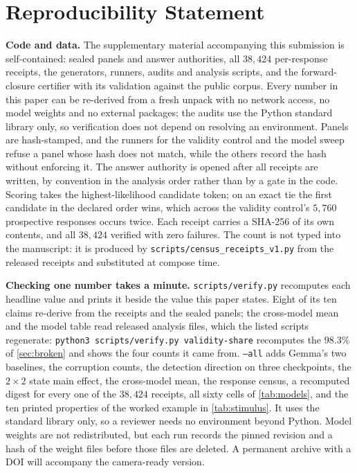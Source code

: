 \documentclass[10pt,twocolumn]{article}
\begin{document}
\section*{Reproducibility Statement}

\textbf{Code and data.} The supplementary material accompanying this submission
is self-contained: sealed panels and answer authorities, all $38{,}424$
per-response receipts, the generators, runners, audits and analysis scripts, and
the forward-closure certifier with its validation against the public corpus.
Every number in this paper can be re-derived from a fresh unpack with no network
access, no model weights and no external packages; the audits use the Python standard
library only, so verification does not depend on resolving an
environment. Panels are hash-stamped, and the runners for the validity control and the model sweep refuse a panel
whose hash does not match, while the others record the hash without enforcing it.
The answer authority is opened after all receipts are written, by convention in
the analysis order rather than by a gate in the code. Scoring takes the
highest-likelihood candidate token; on an exact tie the first candidate in the
declared order wins, which across the validity control's $5{,}760$ prospective responses
occurs twice. Each receipt carries a SHA-256 of its own contents,
and all $38{,}424$ verified with zero failures. The count is not typed into the manuscript: it is
produced by \texttt{scripts/census\_receipts\_v1.py} from the released receipts
and substituted at compose time.

\textbf{Checking one number takes a minute.} \texttt{scripts/verify.py} recomputes each headline value and prints it beside the
value this paper states. Eight of its ten claims re-derive from the receipts and
the sealed panels; the cross-model mean and the model table read released
analysis files, which the listed scripts regenerate:
\texttt{python3 scripts/verify.py validity-share} recomputes the $98.3\%$ of
\cref{sec:broken} and shows the four counts it came from.
\texttt{--all} adds Gemma's two baselines, the corruption counts, the detection
direction on three checkpoints, the $2\times2$ state main effect, the cross-model
mean, the response census, a recomputed digest for every one of the
$38{,}424$ receipts, all sixty cells of \cref{tab:models}, and the ten
printed properties of the worked example in \cref{tab:stimulus}. It uses the
standard library only, so a reviewer needs no environment beyond Python. Model weights are not redistributed, but each run records the
pinned revision and a hash of the weight files before those files are deleted. A
permanent archive with a DOI will accompany the camera-ready version.
\end{document}
